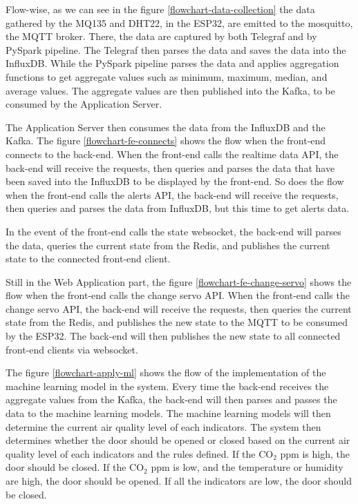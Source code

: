 Flow-wise, as we can see in the figure
\ref{flowchart-data-collection} the data gathered
by the MQ135 and DHT22, in the ESP32, are emitted
to the mosquitto, the MQTT broker. There, the data
are captured by both Telegraf and by PySpark
pipeline. The Telegraf then parses the data and
saves the data into the InfluxDB. While the PySpark
pipeline parses the data and applies aggregation
functions to get aggregate values such as minimum,
maximum, median, and average values. The aggregate
values are then published into the Kafka, to be
consumed by the Application Server.

The Application Server then consumes the data from
the InfluxDB and the Kafka. The figure
\ref{flowchart-fe-connects} shows the flow when the
front-end connects to the back-end. When the
front-end calls the realtime data API, the back-end
will receive the requests, then queries and parses
the data that have been saved into the InfluxDB to
be displayed by the front-end.
So does the flow when the front-end calls the
alerts API, the back-end will receive the requests,
then queries and parses the data from InfluxDB, but this time to get alerts data.

In the event of the front-end calls the state
websocket, the back-end will parses the data,
queries the current state from the Redis, and
publishes the current state to the connected
front-end client.

Still in the Web Application part, the figure
\ref{flowchart-fe-change-servo} shows the flow when
the front-end calls the change servo API. When the
front-end calls the change servo API, the back-end
will receive the requests, then queries the current
state from the Redis, and publishes the new state
to the MQTT to be consumed by the ESP32. The back-end will then publishes the new state to all connected front-end clients via websocket.

The figure \ref{flowchart-apply-ml} shows the flow
of the implementation of the machine learning
model in the system. Every time the back-end receives
the aggregate values from the Kafka, the back-end
will then parses and passes the data to the machine
learning models. The machine learning models will
then determine the current air quality level of
each indicators. The system then determines whether
the door should be opened or closed based on the
current air quality level of each indicators and
the rules defined. If the CO$_2$ ppm is high, the
door should be closed. If the CO$_2$ ppm is low,
and the temperature or humidity are high, the door
should be opened. If all the indicators are low,
the door should be closed.

